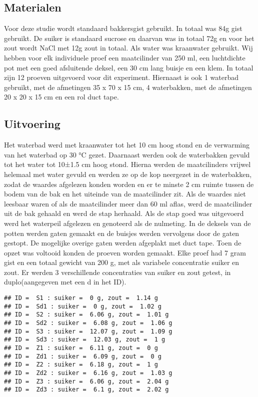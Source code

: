 \documentclass[
]{article}
\begin{document}
\subsection{Materialen}\label{materialen}

Voor deze studie wordt standaard bakkersgist gebruikt. In totaal was 84g gist gebruikt. De suiker is standaard sucrose en daarvan was in totaal 72g en voor het zout wordt NaCl met 12g zout in totaal. Als water was kraanwater gebruikt.
Wij hebben voor elk individuele proef een maatcilinder van 250 ml, een luchtdichte pot met een goed afsluitende deksel, een 30 cm lang buisje en een klem. In totaal zijn 12 proeven uitgevoerd voor dit experiment. Hiernaast is ook 1 waterbad gebruikt, met de afmetingen 35 x 70 x 15 cm, 4 waterbakken, met de afmetingen 20 x 20 x 15 cm en een rol duct tape.

\subsection{Uitvoering}\label{uitvoering}

Het waterbad werd met kraanwater tot het 10 cm hoog stond en de verwarming van het waterbad op 30 °C gezet. Daarnaast werden ook de waterbakken gevuld tot het water tot 10±1.5 cm hoog stond. Hierna werden de maatcilinders vrijwel helemaal met water gevuld en werden ze op de kop neergezet in de waterbakken, zodat de waardes afgelezen konden worden en er te minste 2 cm ruimte tussen de bodem van de bak en het uiteinde van de maatcilinder zit. Als de waardes niet leesbaar waren of als de maatcilinder meer dan 60 ml aflas, werd de maatcilinder uit de bak gehaald en werd de stap herhaald. Als de stap goed was uitgevoerd werd het waterpeil afgelezen en genoteerd als de nulmeting. In de deksels van de potten werden gaten gemaakt en de buisjes werden vervolgens door de gaten gestopt. De mogelijke overige gaten werden afgeplakt met duct tape.
Toen de opzet was voltooid konden de proeven worden gemaakt. Elke proef had 7 gram gist en een totaal gewicht van 200 g, met als variabele concentratie suiker en zout.
Er werden 3 verschillende concentraties van suiker en zout getest, in duplo(aangegeven met een d in het ID).

\begin{verbatim}
## ID =  S1 : suiker =  0 g, zout =  1.14 g
## ID =  Sd1 : suiker =  0 g, zout =  1.02 g
## ID =  S2 : suiker =  6.06 g, zout =  1.01 g
## ID =  Sd2 : suiker =  6.08 g, zout =  1.06 g
## ID =  S3 : suiker =  12.07 g, zout =  1.09 g
## ID =  Sd3 : suiker =  12.03 g, zout =  1 g
## ID =  Z1 : suiker =  6.11 g, zout =  0 g
## ID =  Zd1 : suiker =  6.09 g, zout =  0 g
## ID =  Z2 : suiker =  6.18 g, zout =  1 g
## ID =  Zd2 : suiker =  6.16 g, zout =  1.03 g
## ID =  Z3 : suiker =  6.06 g, zout =  2.04 g
## ID =  Zd3 : suiker =  6.1 g, zout =  2.02 g
\end{verbatim}
\end{document}
